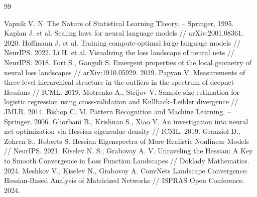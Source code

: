 \documentclass[11pt]{extarticle}
\begin{document}
\begin{thebibliography}{99}

 Vapnik V. N. The Nature of Statistical Learning Theory. -- Springer, 1995.
 Kaplan J. et al. Scaling laws for neural language models // arXiv:2001.08361. 2020.
 Hoffmann J. et al. Training compute-optimal large language models // NeurIPS. 2022.
 Li H. et al. Visualizing the loss landscape of neural nets // NeurIPS. 2018.
 Fort S., Ganguli S. Emergent properties of the local geometry of neural loss landscapes // arXiv:1910.05929. 2019.
 Papyan V. Measurements of three-level hierarchical structure in the outliers in the spectrum of deepnet Hessians // ICML. 2019.
 Motrenko A., Strijov V. Sample size estimation for logistic regression using cross-validation and Kullback–Leibler divergence // JMLR. 2014.
 Bishop C. M. Pattern Recognition and Machine Learning. -- Springer, 2006.
 Ghorbani B., Krishnan S., Xiao Y. An investigation into neural net optimization via Hessian eigenvalue density // ICML. 2019.
 Granziol D., Zohren S., Roberts S. Hessian Eigenspectra of More Realistic Nonlinear Models // NeurIPS. 2021.
 Kiselev N. S., Grabovoy A. V. Unraveling the Hessian: A Key to Smooth Convergence in Loss Function Landscapes // Doklady Mathematics. 2024.
 Meshkov V., Kiselev N., Grabovoy A. ConvNets Landscape Convergence: Hessian-Based Analysis of Matricized Networks // ISPRAS Open Conference. 2024.

\end{thebibliography}
\end{document}
